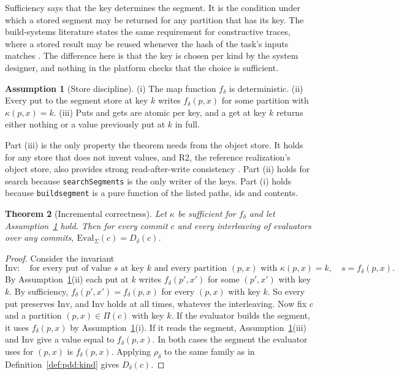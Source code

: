 \documentclass[11pt,letterpaper]{article}
\newtheorem{theorem}{Theorem}[section]
\theoremstyle{definition}
\newtheorem{assumption}[theorem]{Assumption}
\theoremstyle{remark}
\newcommand{\Eval}{\mathrm{Eval}}
\DeclareRobustCommand{\code}[1]{{\def\_{\textunderscore\allowbreak}\texttt{#1}}}
\begin{document}
Sufficiency says that the key determines the segment. It is the condition under which a stored segment may be returned for any partition that has its key. The build-systems literature states the same requirement for constructive traces, where a stored result may be reused whenever the hash of the task's inputs matches \cite{mokhov2018build}. The difference here is that the key is chosen per kind by the system designer, and nothing in the platform checks that the choice is sufficient.

\begin{assumption}[Store discipline]
\label{as:pdd:store}
(i) The map function $f_\delta$ is deterministic. (ii) Every put to the segment store at key $k$ writes $f_\delta(p,x)$ for some partition with $\kappa(p,x)=k$. (iii) Puts and gets are atomic per key, and a get at key $k$ returns either nothing or a value previously put at $k$ in full.
\end{assumption}

Part (iii) is the only property the theorem needs from the object store. It holds for any store that does not invent values, and R2, the reference realization's object store, also provides strong read-after-write consistency \cite{cfr2consistency}. Part (ii) holds for search because \code{searchSegments} is the only writer of the  keys. Part (i) holds because \code{build\_segment} is a pure function of the listed paths, ids and contents.

\begin{theorem}[Incremental correctness]
\label{thm:pdd:incremental}
Let $\kappa$ be sufficient for $f_\delta$ and let Assumption~\ref{as:pdd:store} hold. Then for every commit $c$ and every interleaving of evaluators over any commits, $\Eval_\Sigma(c)=D_\delta(c)$.
\end{theorem}

\begin{proof}
Consider the invariant
\[
\mathrm{Inv}:\quad \text{for every put of value } s \text{ at key } k \text{ and every partition } (p,x) \text{ with } \kappa(p,x)=k,\quad s=f_\delta(p,x).
\]
By Assumption~\ref{as:pdd:store}(ii) each put at $k$ writes $f_\delta(p',x')$ for some $(p',x')$ with key $k$. By sufficiency, $f_\delta(p',x')=f_\delta(p,x)$ for every $(p,x)$ with key $k$. So every put preserves $\mathrm{Inv}$, and $\mathrm{Inv}$ holds at all times, whatever the interleaving. Now fix $c$ and a partition $(p,x)\in\Pi(c)$ with key $k$. If the evaluator builds the segment, it uses $f_\delta(p,x)$ by Assumption~\ref{as:pdd:store}(i). If it reads the segment, Assumption~\ref{as:pdd:store}(iii) and $\mathrm{Inv}$ give a value equal to $f_\delta(p,x)$. In both cases the segment the evaluator uses for $(p,x)$ is $f_\delta(p,x)$. Applying $\rho_\delta$ to the same family as in Definition~\ref{def:pdd:kind} gives $D_\delta(c)$.
\end{proof}
\end{document}
